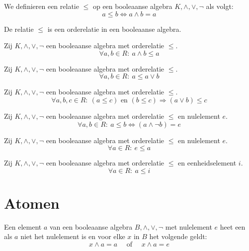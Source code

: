 \documentclass[main.tex]{subfiles}
\begin{document}
\begin{de}
  We definieren een relatie $\le$ op een booleaanse algebra $K,\wedge,\vee,\neg$ als volgt:
  \[ a \le b \Leftrightarrow a \wedge b = a \]
\end{de}

\begin{st}
  De relatie $\le$ is een orderelatie in een booleaanse algebra.
\end{st}


\begin{st}
  Zij $K,\wedge,\vee,\neg$ een booleaanse algebra met orderelatie $\le$.
  \[ \forall a,b \in R:\ a\wedge b \le a \]
\end{st}

\begin{st}
  Zij $K,\wedge,\vee,\neg$ een booleaanse algebra met orderelatie $\le$.
  \[ \forall a,b \in R:\ a \le a \vee b \]
\end{st}

\begin{st}
  Zij $K,\wedge,\vee,\neg$ een booleaanse algebra met orderelatie $\le$.
  \[ \forall a,b,c \in R:\ (a \le c) \text{ en } (b \le c) \Rightarrow (a \vee b) \le c \]
\end{st}

\begin{st}
  Zij $K,\wedge,\vee,\neg$ een booleaanse algebra met orderelatie $\le$ en nulelement $e$.
  \[ \forall a,b \in R:\ a \le b \Leftrightarrow (a \wedge \neg b) = e \]
\end{st}

\begin{st}
  Zij $K,\wedge,\vee,\neg$ een booleaanse algebra met orderelatie $\le$ en nulelement $e$.
  \[ \forall a \in R:\ e \le a \]
\end{st}

\begin{st}
  Zij $K,\wedge,\vee,\neg$ een booleaanse algebra met orderelatie $\le$ en eenheidselement $i$.
  \[ \forall a \in R:\ a \le i \]
\end{st}

\section{Atomen}
\label{sec:atomen}

\begin{de}
  Een element $a$ van een booleaanse algebra $B,\wedge,\vee,\neg$ met nulelement $e$ heet een  als $a$ niet het nulelement is en voor elke $x$ in $B$ het volgende geldt:
  \[ x \wedge a = a \quad\text{ of }\quad x \wedge a = e \]
\end{de}
\end{document}
